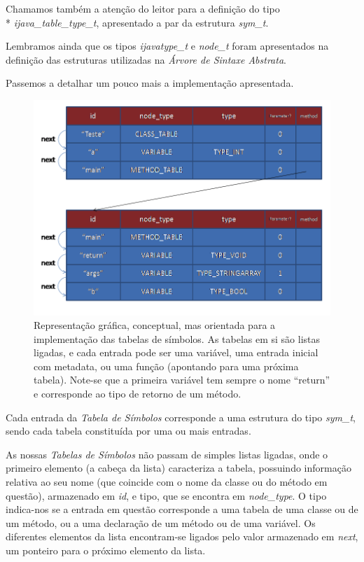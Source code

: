 \documentclass[11pt,a4paper]{article}
\begin{document}
	
	
	Chamamos também a atenção do leitor para a definição do tipo \\* \emph{ijava\_table\_type\_t}, apresentado a par da estrutura \emph{sym\_t}.
	
	Lembramos ainda que os tipos \emph{ijavatype\_t} e \emph{node\_t} foram apresentados na definição das estruturas utilizadas na \emph{Árvore de Sintaxe Abstrata}.
	
	Passemos a detalhar um pouco mais a implementação apresentada.
	
	\begin{figure}[H]
  \centering
      \includegraphics[width=\textwidth,height=\textheight,keepaspectratio]{Symbol_Table.png}
  \caption{Representação gráfica, conceptual, mas orientada para a implementação das tabelas de símbolos. As tabelas em si são listas ligadas, e cada entrada pode ser uma variável, uma entrada inicial com metadata, ou uma função (apontando para uma próxima tabela). Note-se que a primeira variável tem sempre o nome ``return'' e corresponde ao tipo de retorno de um método.}
\end{figure}
	
	Cada entrada da \emph{Tabela de Símbolos} corresponde a uma estrutura do tipo \emph{sym\_t}, sendo cada tabela constituída por uma ou mais entradas.
	
	As nossas \emph{Tabelas de Símbolos} não passam de simples listas ligadas, onde o primeiro elemento (a cabeça da lista) caracteriza a tabela, possuindo informação relativa ao seu nome (que coincide com o nome da classe ou do método em questão), armazenado em \emph{id}, e tipo, que se encontra em \emph{node\_type}. O tipo indica-nos se a entrada em questão corresponde a uma tabela de uma classe ou de um método, ou a uma declaração de um método ou de uma variável. Os diferentes elementos da lista encontram-se ligados pelo valor armazenado em \emph{next}, um ponteiro para o próximo elemento da lista.
	
\end{document}
